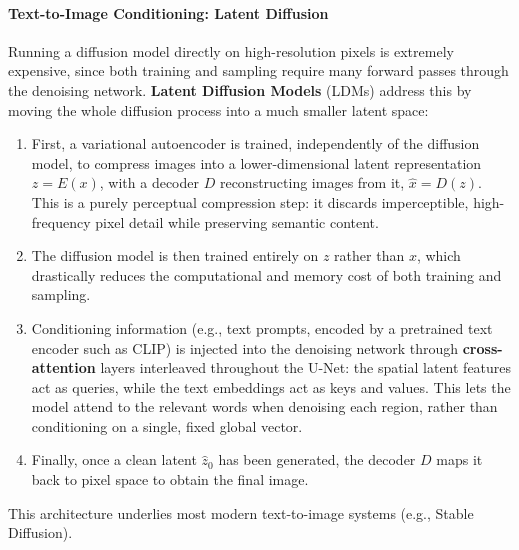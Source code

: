 \paragraph{Text-to-Image Conditioning: Latent Diffusion}
Running a diffusion model directly on high-resolution pixels is extremely expensive, since both training and sampling require many forward passes through the denoising network. \textbf{Latent Diffusion Models} (LDMs) address this by moving the whole diffusion process into a much smaller latent space:
\begin{enumerate}
    \item First, a variational autoencoder is trained, independently of the diffusion model, to compress images into a lower-dimensional latent representation \(z = E(x)\), with a decoder \(D\) reconstructing images from it, \(\hat x = D(z)\). This is a purely perceptual compression step: it discards imperceptible, high-frequency pixel detail while preserving semantic content.
    \item The diffusion model is then trained entirely on \(z\) rather than \(x\), which drastically reduces the computational and memory cost of both training and sampling.
    \item Conditioning information (e.g., text prompts, encoded by a pretrained text encoder such as CLIP) is injected into the denoising network through \textbf{cross-attention} layers interleaved throughout the U-Net: the spatial latent features act as queries, while the text embeddings act as keys and values. This lets the model attend to the relevant words when denoising each region, rather than conditioning on a single, fixed global vector.
    \item Finally, once a clean latent \(\hat z_0\) has been generated, the decoder \(D\) maps it back to pixel space to obtain the final image.
\end{enumerate}
This architecture underlies most modern text-to-image systems (e.g., Stable Diffusion).